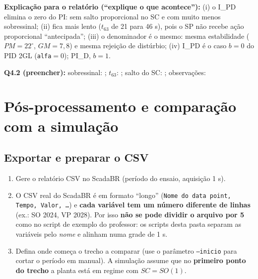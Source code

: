 \documentclass[11pt,a4paper]{article}
\begin{document}
\textbf{Explicação para o relatório (``explique o que acontece''):} (i) o I\_PD elimina o zero do PI: sem salto proporcional no SC e com muito menos sobressinal; (ii) fica mais lento ($t_{63}$ de 21 para 46 s), pois o SP não recebe ação proporcional ``antecipada''; (iii) o denominador é o mesmo: mesma estabilidade ($PM=22^\circ$, $GM=7{,}8$) e mesma rejeição de distúrbio; (iv) I\_PD é o caso $b=0$ do PID 2GL (\texttt{alfa}$=0$); PI\_D, $b=1$.
\begin{real}\textbf{Q4.2 (preencher):} sobressinal: \underline{\hspace{1.5cm}}; $t_{63}$: \underline{\hspace{1.5cm}}; salto do SC: \underline{\hspace{1.5cm}}; observações: \underline{\hspace{5cm}}\end{real}

\section{Pós-processamento e comparação com a simulação}\label{pos}
\subsection{Exportar e preparar o CSV}
\begin{enumerate}
\item Gere o relatório CSV no ScadaBR (período do ensaio, aquisição 1 s).
\item O CSV real do ScadaBR é em formato ``longo'' (\texttt{Nome do data point, Tempo, Valor, \ldots}) e \textbf{cada variável tem um número diferente de linhas} (ex.: SO 2024, VP 2028). Por isso \textbf{não se pode dividir o arquivo por 5} como no script de exemplo do professor: os scripts desta pasta separam as variáveis pelo \emph{nome} e alinham numa grade de 1 s.
\item Defina onde começa o trecho a comparar (use o parâmetro \texttt{--inicio} para cortar o período em manual). A simulação assume que no \textbf{primeiro ponto do trecho} a planta está em regime com $SC=SO(1)$.
\end{enumerate}
\end{document}
